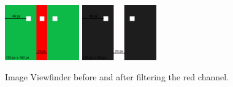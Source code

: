 \documentclass[a4paper, 10pt, conference]{IEEEtran}
\begin{document}
\begin{figure}[t]
    \includegraphics[width=121px, left]{sensor.jpg}
     \includegraphics[width=121px, right]{sensor-red.jpg}
    \caption{Image Viewfinder before and after filtering the red channel. }
    \label{fig:my_label} 
\end{figure}
\end{document}
